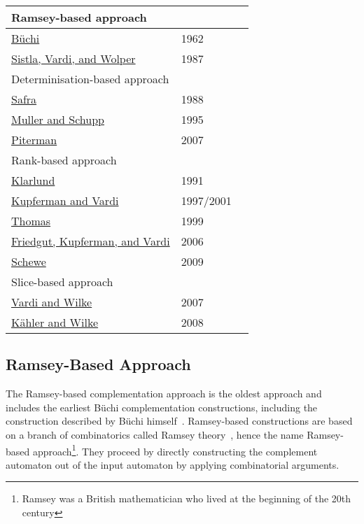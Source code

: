 \newcommand{\ii}{\hspace{5mm}}
\newcommand{\vstrut}{\vphantom{$2^{2^2}$}}
\begin{longtable}[l]{lll}
\multicolumn{3}{l}{Ramsey-based approach} \\
\hline
\ii\hyperref[2_buchi62]{Büchi} & 1962 & \cite{buchi1960decision} \\
\ii\hyperref[2_svw87]  {Sistla, Vardi, and Wolper} & 1987 & \cite{1985_sistla,PrasadSistla1987217} \\
\multicolumn{3}{l}{Determinisation-based approach\vstrut} \\
\hline
\ii\hyperref[2_safra88]{Safra} & 1988 & \cite{1988_safra_2,1988_safra_1} \\
\ii\hyperref[2_ms95]{Muller and Schupp} & 1995 & \cite{Muller199569} \\
\ii\hyperref[2_pit07]{Piterman} & 2007 & \cite{2006_piterman,2007_piterman} \\
\multicolumn{3}{l}{Rank-based approach\vstrut} \\
\hline
\ii\hyperref[2_kla91]{Klarlund} & 1991 & \cite{1991_klarlund} \\
\ii\hyperref[2_kv01]{Kupferman and Vardi} & 1997/2001 & \cite{1997_vardi,Kupferman:2001} \\
\ii\hyperref[2_th99]{Thomas} & 1999 & \cite{1999_thomas} \\
\ii\hyperref[2_fkv06]{Friedgut, Kupferman, and Vardi} & 2006 & \cite{2004_friedgut,friedgut2006buchi} \\
\ii\hyperref[2_schewe09]{Schewe} & 2009 & \cite{schewe2009buchi} \\
\multicolumn{3}{l}{Slice-based approach\vstrut} \\
\hline
\ii\hyperref[2_vw07]{Vardi and Wilke} & 2007 & \cite{vardi2007automata} \\
\ii\hyperref[2_kw08]{Kähler and Wilke} & 2008 & \cite{2008_kaehler} \\
\end{longtable}


\subsection{Ramsey-Based Approach}
\label{2_ramsey-based}
The Ramsey-based complementation approach is the oldest approach and includes the earliest Büchi complementation constructions, including the construction described by Büchi himself~\cite{buchi1960decision}. Ramsey-based constructions are based on a branch of combinatorics called Ramsey theory~\cite{graham1990ramsey}, hence the name Ramsey-based approach\footnote{Ramsey was a British mathematician who lived at the beginning of the 20th century}. They proceed by directly constructing the complement automaton out of the input automaton by applying combinatorial arguments.

